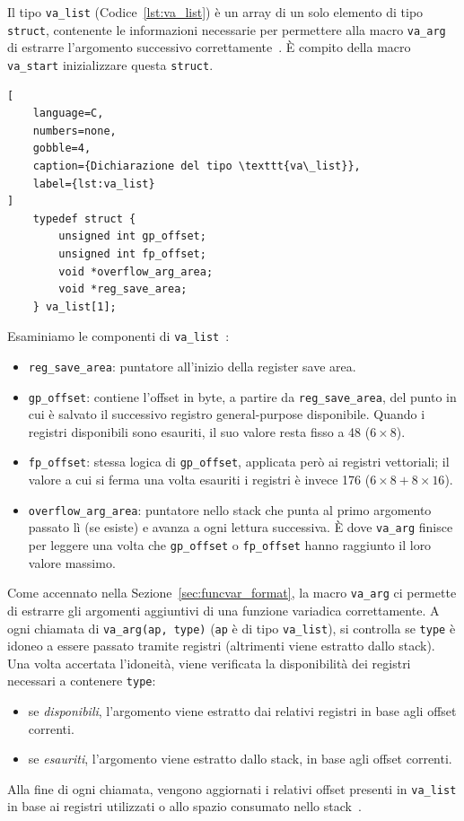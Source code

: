 Il tipo \texttt{va\_list} (Codice~\ref{lst:va_list}) è un array di un solo elemento di tipo \texttt{struct}, contenente le informazioni necessarie per permettere alla macro \texttt{va\_arg} di estrarre l'argomento successivo correttamente~\cite{psabi2025}. È compito della macro \texttt{va\_start} inizializzare questa \texttt{struct}.
\begin{lstlisting}[
    language=C,
    numbers=none,
    gobble=4,
    caption={Dichiarazione del tipo \texttt{va\_list}},
    label={lst:va_list}
]
    typedef struct {
        unsigned int gp_offset;
        unsigned int fp_offset;
        void *overflow_arg_area;
        void *reg_save_area;
    } va_list[1];
\end{lstlisting}

Esaminiamo le componenti di \texttt{va\_list}~\cite{psabi2025}:
\begin{itemize}
    \item \texttt{reg\_save\_area}: puntatore all'inizio della register save area.

    \item \texttt{gp\_offset}: contiene l'offset in byte, a partire da \texttt{reg\_save\_area}, del punto in cui è salvato il successivo registro general-purpose disponibile. Quando i registri disponibili sono esauriti, il suo valore resta fisso a 48 ($6 \times 8$).
    
    \item \texttt{fp\_offset}: stessa logica di \texttt{gp\_offset}, applicata però ai registri vettoriali; il valore a cui si ferma una volta esauriti i registri è invece 176 ($6 \times 8 + 8 \times 16$).

    \item \texttt{overflow\_arg\_area}: puntatore nello stack che punta al primo argomento passato lì (se esiste) e avanza a ogni lettura successiva. È dove \texttt{va\_arg} finisce per leggere una volta che \texttt{gp\_offset} o \texttt{fp\_offset} hanno raggiunto il loro valore massimo.
\end{itemize}

Come accennato nella Sezione~\ref{sec:funcvar_format}, la macro \texttt{va\_arg} ci permette di estrarre gli argomenti aggiuntivi di una funzione variadica correttamente.
A ogni chiamata di \texttt{va\_arg(ap, type)} (\texttt{ap} è di tipo \texttt{va\_list}), si controlla se \texttt{type} è idoneo a essere passato tramite registri (altrimenti viene estratto dallo stack).
Una volta accertata l'idoneità, viene verificata la disponibilità dei registri necessari a contenere \texttt{type}:
\begin{itemize}
    \item se \emph{disponibili}, l'argomento viene estratto dai relativi registri in base agli offset correnti.
    \item se \emph{esauriti}, l'argomento viene estratto dallo stack, in base agli offset correnti.
\end{itemize}
Alla fine di ogni chiamata, vengono aggiornati i relativi offset presenti in \texttt{va\_list} in base ai registri utilizzati o allo spazio consumato nello stack~\cite{psabi2025}.

